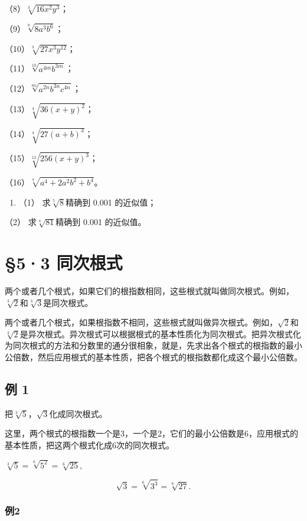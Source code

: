 （8）\(\sqrt[3]{16x^2y^3}\)；

（9）\(\sqrt[8]{8a^3b^6}\)；

（10）\(\sqrt[3]{27x^3y^{12}}\)；

（11）\(\sqrt[10]{a^{4m}b^{3m}}\)；

（12）\(\sqrt[6n]{a^{2n}b^{3n}c^{4n}}\)；

（13）\(\sqrt[4]{36(x + y)^2}\)；

（14）\(\sqrt[4]{27(a + b)^3}\)；

（15）\(\sqrt[12]{256(x + y)^3}\)；

（16）\(\sqrt[4]{a^4 + 2a^2b^2 + b^4}\)。

\begin{enumerate}[start=3]
\item
  （1） 求\(\sqrt[5]{8}\)精确到 0.001 的近似值；
\end{enumerate}

（2） 求\(\sqrt[4]{81}\)精确到 0.001 的近似值。

\section{§5·3 同次根式}

两个或者几个根式，如果它们的根指数相同，这些根式就叫做同次根式。例如，\(\sqrt[3]{2}\)和\(\sqrt[3]{3}\)是同次根式。

两个或者几个根式，如果根指数不相同，这些根式就叫做异次根式。例如，\(\sqrt{2}\)和\(\sqrt[3]{2}\)是异次根式。异次根式可以根据根式的基本性质化为同次根式。把异次根式化为同次根式的方法和分数里的通分很相象，就是，先求出各个根式的根指数的最小公倍数，然后应用根式的基本性质，把各个根式的根指数都化成这个最小公倍数。

\subsection{例 1}

把\(\sqrt[3]{5}\)，\(\sqrt{3}\)化成同次根式。

这里，两个根式的根指数一个是3，一个是2，它们的最小公倍数是6，应用根式的基本性质，把这两个根式化成6次的同次根式。

 \(\sqrt[3]{5} = \sqrt[6]{5^2} = \sqrt[6]{25},\)

\[
\sqrt {3} = \sqrt[6]{3 ^ {3}} = \sqrt[6]{27}.
\]

\subsubsection{例2}

